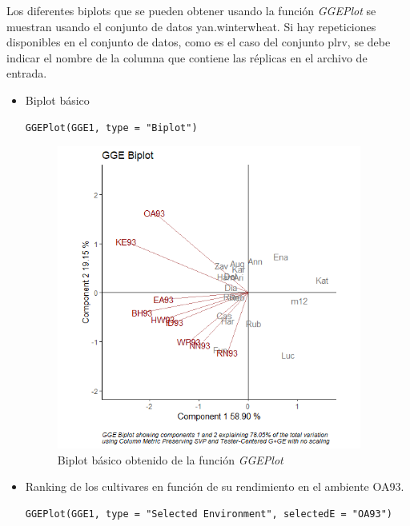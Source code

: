 Los diferentes biplots que se pueden obtener usando la función \emph{GGEPlot} se muestran usando el conjunto de datos yan.winterwheat. Si hay repeticiones disponibles en el conjunto de datos, como es el caso del conjunto plrv, se debe indicar el nombre de la columna que contiene las réplicas en el archivo de entrada.


\begin{itemize}
\item Biplot básico

\begin{lstlisting}
GGEPlot(GGE1, type = "Biplot")
\end{lstlisting}

\begin{figure}[h!]
	\begin{center}
		\includegraphics[width=10cm]{./Graficos/GGE_BIPLOT.png}
	\end{center}
	\caption{Biplot básico obtenido de la función \emph{GGEPlot}}
\end{figure}

\item Ranking de los cultivares en función de su rendimiento en el ambiente OA93.

\begin{lstlisting}
GGEPlot(GGE1, type = "Selected Environment", selectedE = "OA93")
\end{lstlisting}



\end{itemize}
